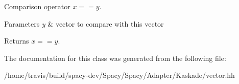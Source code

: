 \-Comparison operator $ x==y$. 


\begin{DoxyParams}{\-Parameters}
{\em y} & vector to compare with this vector \\
\hline
\end{DoxyParams}
\begin{DoxyReturn}{\-Returns}
$ x==y$. 
\end{DoxyReturn}


\-The documentation for this class was generated from the following file\-:\begin{DoxyCompactItemize}
\item 
/home/travis/build/spacy-\/dev/\-Spacy/\-Spacy/\-Adapter/\-Kaskade/vector.\-hh\end{DoxyCompactItemize}
